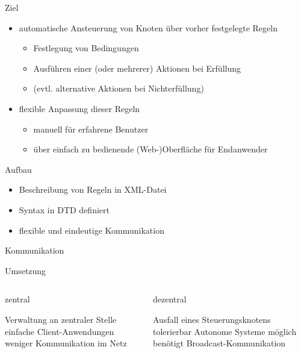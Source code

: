 \begin{frame}{\insertsubsection}{Ziel}
	\begin{itemize}
	\item	automatische Ansteuerung von Knoten über vorher festgelegte
		Regeln
		\begin{itemize}
		\item	Festlegung von Bedingungen
		\item	Ausführen einer (oder mehrerer) Aktionen bei Erfüllung
		\item	(evtl. alternative Aktionen bei Nichterfüllung)
		\end{itemize}
	\item	flexible Anpassung dieser Regeln
		\begin{itemize}
		\item	manuell für erfahrene Benutzer
		\item	über einfach zu bedienende (Web-)Oberfläche für
			Endanwender
		\end{itemize}
	\end{itemize}
\end{frame}
\begin{frame}{\insertsubsection}{Aufbau}
	\begin{itemize}
	\item	Beschreibung von Regeln in XML-Datei
	\item	Syntax in DTD definiert
	\item	flexible und eindeutige Kommunikation
	\end{itemize}
	
\end{frame}
\begin{frame}{\insertsubsection}{Kommunikation}
	
\end{frame}
\begin{frame}{\insertsubsection}{Umsetzung}
	\begin{columns}
		\begin{block}{zentral}
		\begin{proconlist}
		\pro	Verwaltung an zentraler Stelle
		\pro	einfache Client-Anwendungen
		\pro	weniger Kommunikation im Netz
		\end{proconlist}
		\end{block}
	\column{.45\textwidth}
		\begin{block}{dezentral}
		\begin{proconlist}
		\pro	Ausfall eines Steuerungsknotens tolerierbar
		\pro	Autonome Systeme möglich
		\contra	benötigt Broadcast-Kommunikation
		\end{proconlist}
		\end{block}
	\end{columns}
\end{frame}
